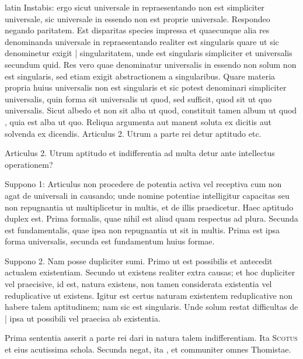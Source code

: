 \begin{otherlanguage*}{latin}
\pstart
  Instabis: ergo sicut universale in repraesentando non est simpliciter universale, sic universale in essendo non est proprie universale. Respondeo negando paritatem. Est disparitas species impressa et quaecunque alia res denominanda universale in repraesentando realiter est singularis quare ut sic denominetur exigit \textnormal{|} singularitatem, unde est singularis simpliciter et universalis secundum quid. Res vero quae denominatur universalis in essendo non solum non est singularis, sed etiam exigit abstractionem a singularibus. Quare materia propria huius universalis non est singularis et sic potest denominari simpliciter universalis, quin forma sit universalis ut quod, sed sufficit, quod sit ut quo universalis. Sicut albedo et non sit alba ut quod, constituit tamen album ut quod , quia est alba ut quo. Reliqua argumenta aut manent soluta ex dicitis aut solvenda ex dicendis. Articulus 2. Utrum a parte rei detur aptitudo etc. 
\pend

        \pstart
        \pend
      
\pstart
\noindent%
 Articulus 2. Utrum aptitudo et indifferentia ad multa detur ante intellectus operationem? 
\pend

\pstart
  Suppono 1: Articulus non procedere de potentia activa vel receptiva cum non agat de universali in causando; unde nomine potentiae intelligitur capacitas seu non repugnantia ut multiplicetur in multis, et de illis praedicetur. Haec aptitudo duplex est. Prima formalis, quae nihil est aliud quam respectus ad plura. Secunda est fundamentalis, quae ipsa non repugnantia ut sit in multis. Prima est ipsa forma universalis, secunda est fundamentum huius formae. 
\pend

\pstart
  Suppono 2. Nam posse dupliciter sumi. Primo ut est possibilis et antecedit actualem existentiam. Secundo ut existens realiter extra causas; et hoc dupliciter vel praecisive, id est, natura existens, non tamen considerata existentia vel reduplicative ut existens. Igitur est certus naturam existentem reduplicative non habere talem aptitudinem; nam sic est singularis. Unde solum restat difficultas de \textnormal{|}   ipsa ut possibili vel praecisa ab existentia. 
\pend

\pstart
  Prima sententia asserit a parte rei dari in natura talem indifferentiam. Ita \textsc{Scotus} et eius acutissima schola. Secunda negat, ita ,   et communiter omnes Thomistae. 
\pend


\end{otherlanguage*}
